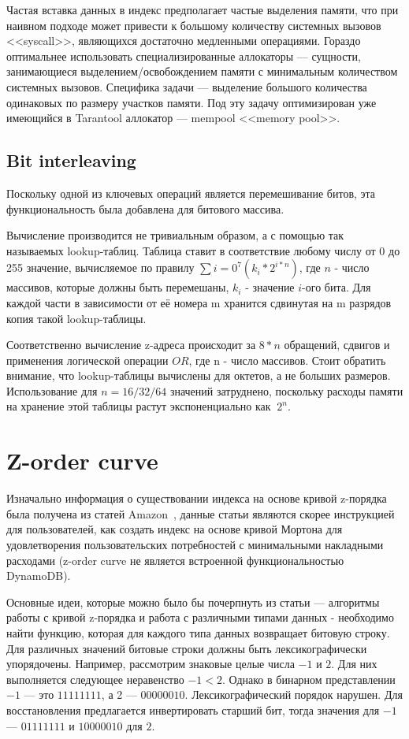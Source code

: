 Частая вставка данных в индекс предполагает частые выделения памяти,
что при наивном подходе может привести к большому количеству системных
вызовов <<syscall>>, являющихся достаточно медленными операциями.
Гораздо оптимальнее использовать специализированные аллокаторы ---
сущности, занимающиеся выделением/освобождением памяти с минимальным количеством системных вызовов.
Специфика задачи --- выделение большого количества одинаковых по размеру участков памяти.
Под эту задачу оптимизирован уже имеющийся в Tarantool аллокатор ---
mempool <<memory pool>>.

\subsection{Bit interleaving}
Поскольку одной из ключевых операций является перемешивание битов, эта функциональность была добавлена для битового массива.

Вычисление производится не тривиальным образом, а с помощью так называемых lookup-таблиц. Таблица ставит в соответствие любому числу от 0 до 255 значение, вычисляемое по правилу $\sum{i=0}^7(k_i * 2^{i*n})$, где $n$ - число массивов, которые должны быть перемешаны, $k_i$ - значение $i$-ого бита. Для каждой части в зависимости от её номера m хранится сдвинутая на m разрядов копия такой lookup-таблицы.

Соответственно вычисление z-адреса происходит за $8*n$ обращений, сдвигов и применения логической операции $OR$, где n - число массивов. Стоит обратить внимание, что lookup-таблицы вычислены для октетов, а не больших размеров. Использование для $n=16/32/64$ значений затруднено, поскольку расходы памяти на хранение этой таблицы растут экспоненциально как $~2^n$.


\section{Z-order curve}
\label{zordercurvesection}
Изначально информация о существовании индекса на основе кривой z-порядка была получена из статей Amazon~\cite{DynamoZorderP1, DynamoZorderP2}, данные статьи являются скорее инструкцией для пользователей, как создать индекс на основе кривой Мортона для удовлетворения пользовательских потребностей с минимальными накладными расходами (z-order curve не является встроенной функциональностью DynamoDB).

Основные идеи, которые можно было бы почерпнуть из статьи --- алгоритмы работы с кривой z-порядка и работа с различными типами данных - необходимо найти функцию, которая для каждого типа данных возвращает битовую строку. Для различных значений битовые строки должны быть лексикографически упорядочены. Например, рассмотрим знаковые целые числа $-1$ и $2$. Для них выполняется следующее неравенство $-1 < 2$. Однако в бинарном представлении $-1$ --- это $11111111$, а 2 --- $00000010$. Лексикографический порядок нарушен. Для восстановления предлагается инвертировать старший бит, тогда значения для $-1$ --- $01111111$ и $10000010$ для $2$.

